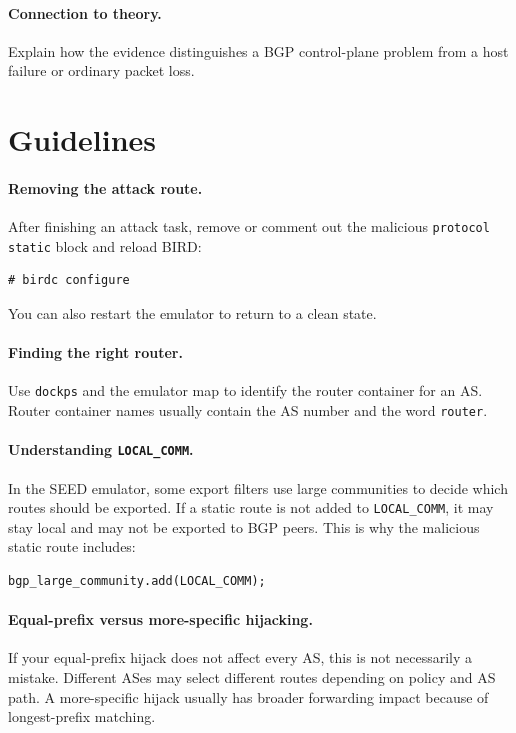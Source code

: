 \paragraph{Connection to theory.}
Explain how the evidence distinguishes a BGP control-plane problem from a host
failure or ordinary packet loss.


\section{Guidelines}

\paragraph{Removing the attack route.}
After finishing an attack task, remove or comment out the malicious
\texttt{protocol static} block and reload BIRD:

\begin{lstlisting}
# birdc configure
\end{lstlisting}

You can also restart the emulator to return to a clean state.

\paragraph{Finding the right router.}
Use \texttt{dockps} and the emulator map to identify the router container for
an AS. Router container names usually contain the AS number and the word
\texttt{router}.

\paragraph{Understanding \texttt{LOCAL\_COMM}.}
In the SEED emulator, some export filters use large communities to decide which
routes should be exported. If a static route is not added to
\texttt{LOCAL\_COMM}, it may stay local and may not be exported to BGP peers.
This is why the malicious static route includes:

\begin{lstlisting}
bgp_large_community.add(LOCAL_COMM);
\end{lstlisting}

\paragraph{Equal-prefix versus more-specific hijacking.}
If your equal-prefix hijack does not affect every AS, this is not necessarily a
mistake. Different ASes may select different routes depending on policy and AS
path. A more-specific hijack usually has broader forwarding impact because of
longest-prefix matching.

